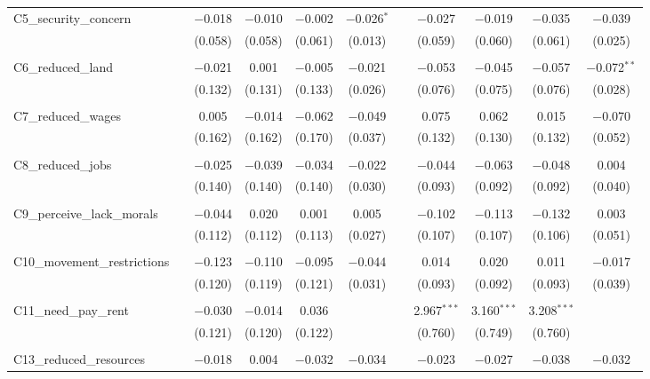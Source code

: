 \begin{table}[H]
\begin{tabular}{@{\extracolsep{4pt}}lcccccccccc}
 C5\_security\_concern &  & $-$0.018 & $-$0.010 & $-$0.002 & $-$0.026$^{*}$ &  & $-$0.027 & $-$0.019 & $-$0.035 & $-$0.039 \\ 
  &  & (0.058) & (0.058) & (0.061) & (0.013) &  & (0.059) & (0.060) & (0.061) & (0.025) \\ 
  & & & & & & & & & & \\ 
 C6\_reduced\_land &  & $-$0.021 & 0.001 & $-$0.005 & $-$0.021 &  & $-$0.053 & $-$0.045 & $-$0.057 & $-$0.072$^{**}$ \\ 
  &  & (0.132) & (0.131) & (0.133) & (0.026) &  & (0.076) & (0.075) & (0.076) & (0.028) \\ 
  & & & & & & & & & & \\ 
 C7\_reduced\_wages &  & 0.005 & $-$0.014 & $-$0.062 & $-$0.049 &  & 0.075 & 0.062 & 0.015 & $-$0.070 \\ 
  &  & (0.162) & (0.162) & (0.170) & (0.037) &  & (0.132) & (0.130) & (0.132) & (0.052) \\ 
  & & & & & & & & & & \\ 
 C8\_reduced\_jobs &  & $-$0.025 & $-$0.039 & $-$0.034 & $-$0.022 &  & $-$0.044 & $-$0.063 & $-$0.048 & 0.004 \\ 
  &  & (0.140) & (0.140) & (0.140) & (0.030) &  & (0.093) & (0.092) & (0.092) & (0.040) \\ 
  & & & & & & & & & & \\ 
 C9\_perceive\_lack\_morals &  & $-$0.044 & 0.020 & 0.001 & 0.005 &  & $-$0.102 & $-$0.113 & $-$0.132 & 0.003 \\ 
  &  & (0.112) & (0.112) & (0.113) & (0.027) &  & (0.107) & (0.107) & (0.106) & (0.051) \\ 
  & & & & & & & & & & \\ 
 C10\_movement\_restrictions &  & $-$0.123 & $-$0.110 & $-$0.095 & $-$0.044 &  & 0.014 & 0.020 & 0.011 & $-$0.017 \\ 
  &  & (0.120) & (0.119) & (0.121) & (0.031) &  & (0.093) & (0.092) & (0.093) & (0.039) \\ 
  & & & & & & & & & & \\ 
 C11\_need\_pay\_rent &  & $-$0.030 & $-$0.014 & 0.036 &  &  & 2.967$^{***}$ & 3.160$^{***}$ & 3.208$^{***}$ &  \\ 
  &  & (0.121) & (0.120) & (0.122) &  &  & (0.760) & (0.749) & (0.760) &  \\ 
  & & & & & & & & & & \\ 
 C13\_reduced\_resources &  & $-$0.018 & 0.004 & $-$0.032 & $-$0.034 &  & $-$0.023 & $-$0.027 & $-$0.038 & $-$0.032 \\ 

\end{tabular}
\end{table}
